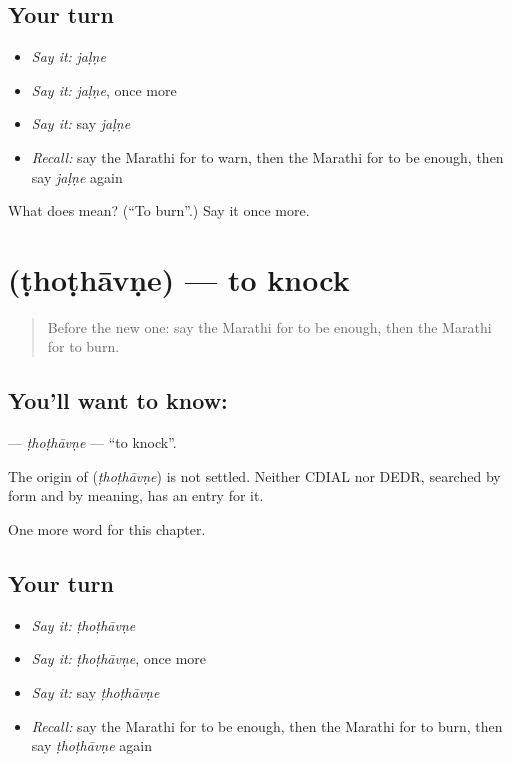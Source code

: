 \subsection*{Your turn}
\begin{itemize}
\raggedright
  \item \emph{Say it:} \emph{jaḷṇe}
  \item \emph{Say it:} \emph{jaḷṇe}, once more
  \item \emph{Say it:} say \emph{jaḷṇe}
  \item \emph{Recall:} say the Marathi for to warn, then the Marathi for to be enough, then say \emph{jaḷṇe} again
\end{itemize}

\begin{tcolorbox}[breakable,colback=teal!4,colframe=teal!35!black,title={Before you move on}]
What does  mean? (\textquotedblleft{}To burn\textquotedblright{}.) Say it once more.
\end{tcolorbox}
\section[\texorpdfstring{\mr{ठोठावणे} (ṭhoṭhāvṇe)}{ठोठावणे (ṭhoṭhāvṇe)}]{ (ṭhoṭhāvṇe) — to knock}

\label{lesson:MR-C195-thothavne}



\begin{quote}
Before the new one: say the Marathi for to be enough, then the Marathi for to burn.
\end{quote}

\subsection*{You'll want to know: }
\textbf{} — \emph{ṭhoṭhāvṇe} — \textquotedblleft{}to knock\textquotedblright{}.

\begin{cousinweb}
The origin of \textbf{} (\emph{ṭhoṭhāvṇe}) is not settled. Neither CDIAL nor DEDR, searched by form and by meaning, has an entry for it.
\end{cousinweb}

\begin{grammarlens}[title={What you've built}]
One more word for this chapter.
\end{grammarlens}

\subsection*{Your turn}
\begin{itemize}
\raggedright
  \item \emph{Say it:} \emph{ṭhoṭhāvṇe}
  \item \emph{Say it:} \emph{ṭhoṭhāvṇe}, once more
  \item \emph{Say it:} say \emph{ṭhoṭhāvṇe}
  \item \emph{Recall:} say the Marathi for to be enough, then the Marathi for to burn, then say \emph{ṭhoṭhāvṇe} again
\end{itemize}

